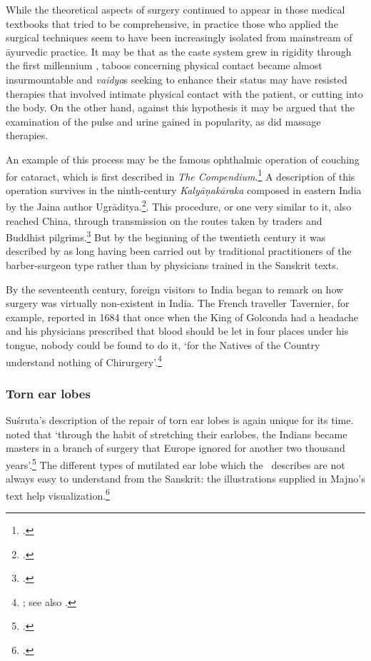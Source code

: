 
While the theoretical aspects of surgery continued to appear in those
medical textbooks that tried to be comprehensive, in practice those who
applied the surgical techniques seem to have been increasingly isolated from
mainstream of āyurvedic practice. It may be that as the caste system grew in
rigidity through the first millennium \AD, taboos concerning physical
contact became almost insurmountable and \emph{vaidya}s seeking to enhance
their status may have resisted therapies that involved intimate physical
contact with the patient, or cutting into the body.  On the other hand,
against this hypothesis it may be argued that the examination of the pulse
and urine gained in popularity, as did massage therapies.

An example of this process may be the famous ophthalmic operation of couching 
for
cataract, which is first described in \emph{The Compendium}.\footcite[Well
outlined by][378--9]{majn-1975} A description of this operation survives in the
ninth-century \emph{Kalyāṇa\-kāraka} composed in eastern India by the Jaina 
author
Ugrāditya.\footcites[67, n.\,76]{meul-1984}[IIA, 151\,ff]{meul-hist}[366--368,
375--378]{shas-kaly}. This procedure, or one very similar to it, also reached
China, through transmission on the routes taken by traders and Buddhist
pilgrims.\footcites[132--48]{unsc-medi}{desh-1999,desh-2000} But by the 
beginning
of the twentieth century it was described by \citet{elli-indi} as long having been
carried out by traditional practitioners of the barber-surgeon type rather than by
physicians trained in the Sanskrit texts.

By the seventeenth century, foreign visitors to India began to remark on how
surgery was virtually non-existent in India. The French traveller
Tavernier\label{tavernier}, for example, reported in 1684 that once when the
King of Golconda had a headache and his physicians prescribed that
blood should be let in four places under his tongue, nobody could be found
to do it, `for the Natives of the Country understand nothing of
Chirurgery'.\footnote{\cite[1.2.103]{tave-trav}; see also
\cite[1.130]{slee-ramb}.}


\subsubsection{Torn ear lobes}

Suśruta's description of the repair of torn ear lobes is again unique for
its time.  \citeauthor{majn-1975} noted that `through the habit of
stretching their earlobes, the Indians became masters in a branch of surgery
that Europe ignored for another two thousand years'.\footcite[291]{majn-1975}  
The different types of
mutilated ear lobe which the \SS\ describes are not always easy to understand
from the Sanskrit: the illustrations supplied in Majno's text help
visualization.\footcites[290--291]{majn-1975}[reproduced with permission 
in][92--93]{wuja-2003}

